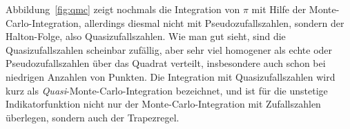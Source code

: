 Abbildung~\ref{fig:qmc} zeigt nochmals die Integration von $\pi$ mit
Hilfe der Monte-Carlo-Integration, allerdings diesmal nicht mit
Pseudozufallszahlen, sondern der Halton-Folge, also
Quasizufallszahlen. Wie man gut sieht, sind die Quasizufallszahlen
scheinbar zufällig, aber sehr viel homogener als echte oder
Pseudozufallszahlen über das Quadrat verteilt, insbesondere auch schon
bei niedrigen Anzahlen von Punkten.  Die Integration mit
Quasizufallszahlen wird kurz als \emph{Quasi}-Monte-Carlo-Integration
bezeichnet, und ist für die unstetige Indikatorfunktion nicht nur der
Monte-Carlo-Integration mit Zufallszahlen überlegen, sondern auch der
Trapezregel.

